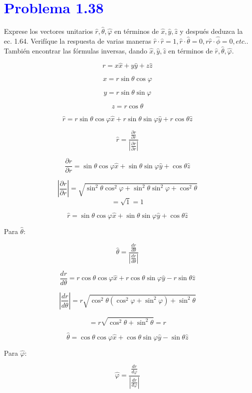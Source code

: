 \documentclass[12pt]{article}
\newcommand{\question}[1]{\textcolor{blue}{\textbf{#1}}}
\begin{document}
\section*{\question{Problema  1.38} }Exprese los vectores unitarios \( \hat{r}, \hat{\theta}, \hat{\varphi} \) en términos de \( \hat{x}, \hat{y}, \hat{z} \) y después deduzca la ec. 1.64.  Verifíque la respuesta de varias maneras \(\hat{r}\cdot\hat{r}= 1, \hat{r}\cdot\hat{\theta}= 0, r\hat{r}\cdot\hat{\phi}= 0, etc.\). También encontrar las fórmulas inversas, dando \( \hat{x}, \hat{y}, \hat{z} \) en términos de \( \hat{r}, \hat{\theta}, \hat{\varphi} \).

\[
r = x \hat{x} + y \hat{y} + z \hat{z}
\]

\[
x = r \sin\theta \cos\varphi
\]

\[
y = r \sin\theta \sin\varphi
\]

\[
z = r \cos\theta
\]

\[
\hat{r} = r\sin\theta \cos\varphi \hat{x} + r\sin\theta \sin\varphi \hat{y} + r\cos\theta \hat{z}
\]

\[
\hat{r}= \frac{ \frac{\partial r}{\partial r}}
{| \frac{\partial r}{\partial r}  |}
\]

\[
\frac{\partial r}{\partial r} = \sin\theta \cos\varphi \hat{x} + \sin\theta \sin\varphi \hat{y} + \cos\theta \hat{z}
\]

\[
\left| \frac{\partial r}{\partial r} \right| = \sqrt{\sin^2\theta \cos^2\varphi + \sin^2\theta \sin^2\varphi + \cos^2\theta} 
\]
\[
= \sqrt{1} = 1
\]

\[
\boxed{\hat{r} = \sin\theta \cos\varphi \hat{x} + \sin\theta \sin\varphi \hat{y} + \cos\theta \hat{z}}
\]

Para \( \hat{\theta} \):

\[
\hat{\theta} = \frac{\frac{dr}{d\theta}}{\left| \frac{dr}{d\theta} \right|}
\]

\[
\frac{dr}{d\theta} = r \cos\theta \cos\varphi \hat{x} + r \cos\theta \sin\varphi \hat{y} - r \sin\theta \hat{z}
\]

\[
\left| \frac{dr}{d\theta} \right| = r \sqrt{\cos^2\theta (\cos^2\varphi + \sin^2\varphi) + \sin^2\theta}
\]

\[
= r \sqrt{\cos^2\theta + \sin^2\theta} = r
\]

\[
\boxed{\hat{\theta} = \cos\theta \cos\varphi \hat{x} + \cos\theta \sin\varphi \hat{y} - \sin\theta \hat{z}}
\]


Para \( \hat{\varphi} \):

\[
\hat{\varphi} = \frac{\frac{dr}{d\varphi}}{\left| \frac{dr}{d\varphi} \right|}
\]
\end{document}
